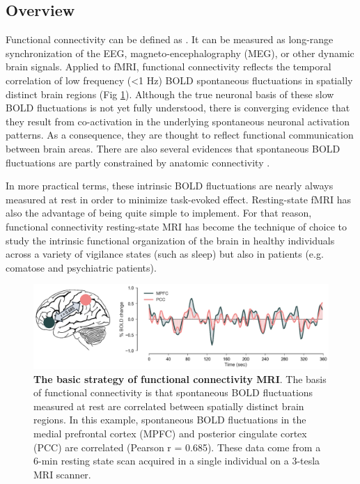 \subsection{Overview}
\label{sec:fmri:fc:overview}

Functional connectivity can be defined as  \citep{van_den_heuvel_exploring_2010}. It can be measured as long-range synchronization of the EEG, magneto-encephalography (MEG), or other dynamic brain signals. Applied to fMRI, functional connectivity reflects the temporal correlation of low frequency (<1 Hz) BOLD spontaneous fluctuations in spatially distinct brain regions (Fig \ref{fig:methods:fcmri}). Although the true neuronal basis of these slow BOLD fluctuations is not yet fully understood, there is converging evidence that they result from co-activation in the underlying spontaneous neuronal activation patterns. As a consequence, they are thought to reflect functional communication between brain areas. There are also several evidences that spontaneous BOLD fluctuations are partly constrained by anatomic connectivity \citep{van_dijk_intrinsic_2010}.

In more practical terms, these intrinsic BOLD fluctuations are nearly always measured at rest in order to minimize task-evoked effect. Resting-state fMRI has also the advantage of being quite simple to implement. For that reason, functional connectivity resting-state MRI has become the technique of choice to study the intrinsic functional organization of the brain in healthy individuals across a variety of vigilance states (such as sleep) but also in patients (e.g. comatose and psychiatric patients).

\begin{figure}[htb]
	\includegraphics[width=\textwidth]{Fig/Methods/fMRI_temporal_correlation/fMRI_temporal_correlation.png}
	\caption[The basic strategy of functional connectivity MRI]{\textbf{The basic strategy of functional connectivity MRI}. The basis of functional connectivity is that spontaneous BOLD fluctuations measured at rest are correlated between spatially distinct brain regions. In this example, spontaneous BOLD fluctuations in the medial prefrontal cortex (MPFC) and posterior cingulate cortex (PCC) are correlated (Pearson r = 0.685). These data come from a 6-min resting state scan acquired in a single individual on a 3-tesla MRI scanner.}
	\label{fig:methods:fcmri}
\end{figure}

